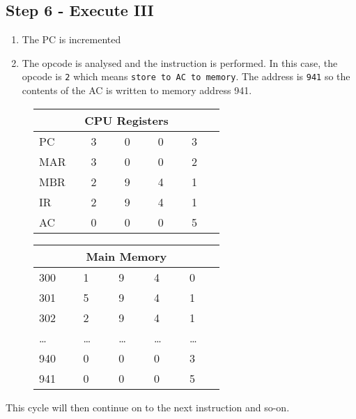 \subsection*{Step 6 - Execute III}
\begin{enumerate}
    \item The PC is incremented
    \item The opcode is analysed and the instruction is performed. In this case, the opcode is \verb|2| which means \verb|store to AC to memory|. The address is \verb|941| so the contents of the AC is written to memory address 941. 
\end{enumerate}

\begin{figure}[H]
    \begin{minipage}[t]{0.45\textwidth}
        \centering
        \begin{tabular}[H]{p{0.15\linewidth} p{0.12\linewidth} p{0.12\linewidth} p{0.12\linewidth} p{0.12\linewidth}}
            \multicolumn{5}{c}{\textbf{CPU Registers}}\\
            \hline
            \hline
            PC & 3 & 0 & 0 & 3 \\
            \hline
            MAR & 3 & 0 & 0 & 2 \\
            \hline
            MBR & 2 & 9 & 4 & 1 \\
            \hline
            IR & 2 & 9 & 4 & 1 \\
            \hline
            AC & 0 & 0 & 0 & 5 \\
            \hline
        \end{tabular}
    \end{minipage}\hfill
    \begin{minipage}[t]{0.45\textwidth}
        \centering
        \begin{tabular}[H]{p{0.15\linewidth} p{0.12\linewidth} p{0.12\linewidth} p{0.12\linewidth} p{0.12\linewidth}}
            \multicolumn{5}{c}{\textbf{Main Memory}}\\
            \hline
            \hline
            300 & 1 & 9 & 4 & 0 \\
            \hline
            301 & 5 & 9 & 4 & 1 \\
            \hline
            302 & 2 & 9 & 4 & 1 \\
            \hline
            \ldots & \ldots & \ldots & \ldots & \ldots \\
            \hline
            940 & 0 & 0 & 0 & 3 \\
            \hline
            941 & 0 & 0 & 0 & 5 \\
            \hline
        \end{tabular}
    \end{minipage}\hfill
\end{figure}

This cycle will then continue on to the next instruction and so-on.